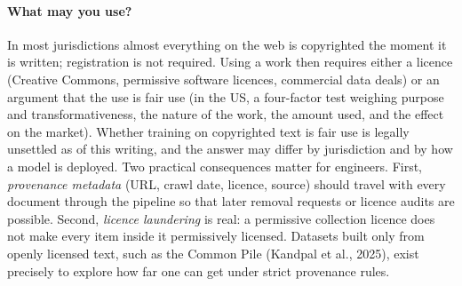 \paragraph{What may you use?} In most jurisdictions almost everything on the web is copyrighted
the moment it is written; registration is not required. Using a work then requires either a
licence (Creative Commons, permissive software licences, commercial data deals) or an argument
that the use is fair use (in the US, a four-factor test weighing purpose and transformativeness,
the nature of the work, the amount used, and the effect on the market). Whether training on
copyrighted text is fair use is legally unsettled as of this writing, and the answer may differ
by jurisdiction and by how a model is deployed. Two practical consequences matter for engineers.
First, \emph{provenance metadata} (URL, crawl date, licence, source) should travel with every
document through the pipeline so that later removal requests or licence audits are possible.
Second, \emph{licence laundering} is real: a permissive collection licence does not make every item inside
it permissively licensed. Datasets built only from openly licensed text, such as the Common Pile
(Kandpal et al., 2025), exist precisely to explore how far one can get under strict
provenance rules.

